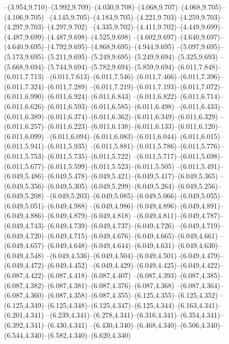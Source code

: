   --(3.954,9.710)--(3.992,9.709)--(4.030,9.708)--(4.068,9.707)--(4.068,9.705)--(4.106,9.705)%
  --(4.145,9.705)--(4.183,9.705)--(4.221,9.703)--(4.259,9.703)--(4.297,9.703)--(4.297,9.702)%
  --(4.335,9.702)--(4.411,9.702)--(4.449,9.699)--(4.487,9.699)--(4.487,9.698)--(4.525,9.698)%
  --(4.602,9.697)--(4.640,9.697)--(4.640,9.695)--(4.792,9.695)--(4.868,9.695)--(4.944,9.695)%
  --(5.097,9.695)--(5.173,9.695)--(5.211,9.695)--(5.249,9.695)--(5.249,9.694)--(5.325,9.693)%
  --(5.668,9.694)--(5.744,9.694)--(5.782,9.694)--(5.859,9.694)--(6.011,7.848)--(6.011,7.713)%
  --(6.011,7.613)--(6.011,7.546)--(6.011,7.466)--(6.011,7.396)--(6.011,7.324)--(6.011,7.289)%
  --(6.011,7.219)--(6.011,7.193)--(6.011,7.072)--(6.011,6.990)--(6.011,6.924)--(6.011,6.843)%
  --(6.011,6.822)--(6.011,6.714)--(6.011,6.626)--(6.011,6.593)--(6.011,6.585)--(6.011,6.498)%
  --(6.011,6.433)--(6.011,6.389)--(6.011,6.374)--(6.011,6.362)--(6.011,6.349)--(6.011,6.329)%
  --(6.011,6.257)--(6.011,6.223)--(6.011,6.138)--(6.011,6.133)--(6.011,6.120)--(6.011,6.099)%
  --(6.011,6.094)--(6.011,6.083)--(6.011,6.044)--(6.011,6.015)--(6.011,5.941)--(6.011,5.935)%
  --(6.011,5.881)--(6.011,5.786)--(6.011,5.776)--(6.011,5.753)--(6.011,5.735)--(6.011,5.722)%
  --(6.011,5.717)--(6.011,5.698)--(6.011,5.677)--(6.011,5.599)--(6.011,5.523)--(6.011,5.505)%
  --(6.011,5.491)--(6.049,5.486)--(6.049,5.478)--(6.049,5.421)--(6.049,5.417)--(6.049,5.365)%
  --(6.049,5.356)--(6.049,5.305)--(6.049,5.299)--(6.049,5.264)--(6.049,5.256)--(6.049,5.208)%
  --(6.049,5.203)--(6.049,5.085)--(6.049,5.066)--(6.049,5.055)--(6.049,5.051)--(6.049,4.988)%
  --(6.049,4.986)--(6.049,4.896)--(6.049,4.891)--(6.049,4.886)--(6.049,4.879)--(6.049,4.818)%
  --(6.049,4.811)--(6.049,4.787)--(6.049,4.743)--(6.049,4.739)--(6.049,4.737)--(6.049,4.726)%
  --(6.049,4.719)--(6.049,4.720)--(6.049,4.715)--(6.049,4.676)--(6.049,4.665)--(6.049,4.661)%
  --(6.049,4.657)--(6.049,4.648)--(6.049,4.644)--(6.049,4.631)--(6.049,4.630)--(6.049,4.548)%
  --(6.049,4.536)--(6.049,4.504)--(6.049,4.501)--(6.049,4.479)--(6.049,4.472)--(6.049,4.452)%
  --(6.049,4.429)--(6.049,4.425)--(6.049,4.422)--(6.087,4.422)--(6.087,4.418)--(6.087,4.407)%
  --(6.087,4.393)--(6.087,4.385)--(6.087,4.382)--(6.087,4.381)--(6.087,4.376)--(6.087,4.368)%
  --(6.087,4.364)--(6.087,4.360)--(6.087,4.358)--(6.087,4.355)--(6.125,4.355)--(6.125,4.352)%
  --(6.125,4.349)--(6.125,4.348)--(6.125,4.347)--(6.125,4.344)--(6.163,4.341)--(6.201,4.341)%
  --(6.239,4.341)--(6.278,4.341)--(6.316,4.341)--(6.354,4.341)--(6.392,4.341)--(6.430,4.341)%
  --(6.430,4.340)--(6.468,4.340)--(6.506,4.340)--(6.544,4.340)--(6.582,4.340)--(6.620,4.340)%
